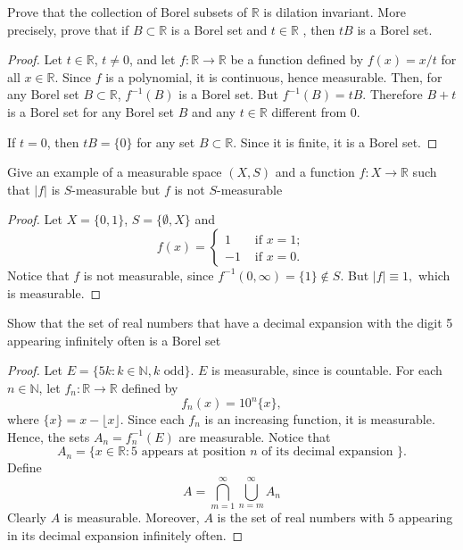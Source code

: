 \documentclass[14.5pt]{article}
\newcommand{\N}{\mathbb{N}}
\newcommand{\R}{\mathbb{R}}
\newenvironment{problem}[2][Problem]{\begin{mdframed}[backgroundcolor=gray!10, leftline = false, rightline=false, linewidth=0.25pt]  \begin{trivlist}
\item[\hskip \labelsep {\bfseries #1}\hskip \labelsep {\bfseries #2.}]}{\end{trivlist} \end{mdframed}  }
\begin{document}
\begin{problem}{2B.8}
Prove that the collection of Borel subsets of $\R$ is dilation invariant. More precisely,
prove that if $B \subset \R$ is a Borel set and $t \in \R$ , then $tB $ is a Borel set.
\end{problem}
\begin{proof}
    Let $t \in \R$, $t \neq 0$, and let $f: \R \rightarrow \R$ be a function defined by $f(x) = x / t$ for all $x \in \R$. Since $f$ is a polynomial, it is continuous, hence measurable. Then, for any Borel set $B \subset \R$, $f^{-1}(B)$ is a Borel set. But $f^{-1}(B) = t B$. Therefore $B + t$ is a Borel set for any Borel set $B$ and any $t \in \R$ different from $0$. 
    
    If $t = 0$, then $t B = \{0\}$ for any set $B \subset \R$. Since it is finite, it is a Borel set.
\end{proof}

\begin{problem}{2B.9}
Give an example of a measurable space $(X, S)$ and a function $f : X \rightarrow \R$ such
that $|f|$ is $S$-measurable but $f$ is not $S$-measurable
\end{problem}
\begin{proof}
    Let $X = \{0,1\}$, $S = \{\emptyset, X\}$ and 
    $$f(x) = \begin{cases}
        1 & \text{ if } x = 1;\\
        -1 & \text{ if } x = 0.
    \end{cases}$$
Notice that $f$ is not measurable, since $f^{-1}(0, \infty) = \{1\} \notin S.$ But $|f| \equiv 1,$ which is measurable.
\end{proof}

\begin{problem}{2B.10}
Show that the set of real numbers that have a decimal expansion with the digit 5
appearing infinitely often is a Borel set
\end{problem}
\begin{proof}
Let $E = \{5 k: k \in \N, k \text{ odd}\}.$ $E$ is measurable, since is countable. For each $n \in \N$, let $f_n: \R \rightarrow \R$ defined by
$$f_n(x) = 10^n \{x\},$$
where $\{x\} = x - \lfloor x \rfloor.$ Since each $f_n$ is an increasing function, it is measurable. Hence, the sets 
$A_n = f_n^{-1}(E)$ are measurable. Notice that 
$$A_n = \{x \in \R: 5 \text{ appears at position } n \text{ of its decimal expansion }\}.$$
Define $$ A = \bigcap_{m=1}^\infty \bigcup_{n = m}^\infty A_n$$
Clearly $A$ is measurable. Moreover, $A$ is the set of real numbers with $5$ appearing in its decimal expansion infinitely often.
\end{proof}
\end{document}

